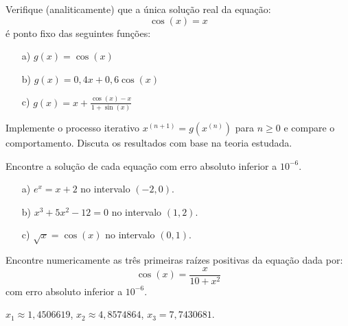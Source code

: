 \begin{exer} Verifique (analiticamente) que a única solução real da equação:
  \begin{equation}
    \cos(x)=x
  \end{equation}
é ponto fixo das seguintes funções:
\begin{itemize}
\item[a)] $g(x)=\cos(x)$
\item[b)] $g(x)=0,4 x+ 0,6\cos(x)$
\item[c)] $g(x)=x+\frac{\cos(x)-x}{1+\sin(x)}$
\end{itemize}
Implemente o processo iterativo $x^{(n+1)}=g(x^{(n)})$ para $n\geq 0$ e compare o comportamento. Discuta os resultados com base na teoria estudada.
\end{exer}


\begin{exer} Encontre a solução de cada equação com erro absoluto inferior a $10^{-6}$.
  \begin{itemize}
  \item[a)] $e^x=x+2$ no intervalo $(-2,0)$.
  \item[b)] $x^3+5x^2-12=0$ no intervalo $(1,2)$.
  \item[c)] $\sqrt{x}=\cos(x)$ no intervalo $(0,1)$.
  \end{itemize}
\end{exer}

\begin{exer} Encontre numericamente as três primeiras raízes positivas da equação dada por:
  \begin{equation}
    \cos(x)=\frac{x}{10+x^2}
  \end{equation}
com erro absoluto inferior a $10^{-6}$.
\end{exer}
\begin{resp}
 $x_1\approx 1,4506619$, $x_2\approx 4,8574864$, $x_3= 7,7430681$.
\end{resp}



